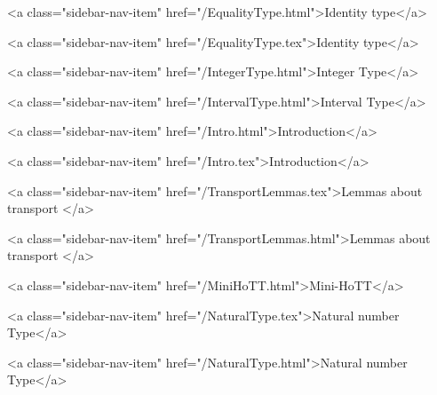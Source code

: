       
        
          <a class="sidebar-nav-item" href="/EqualityType.html">Identity type</a>
        
      
    
      
        
          <a class="sidebar-nav-item" href="/EqualityType.tex">Identity type</a>
        
      
    
      
        
          <a class="sidebar-nav-item" href="/IntegerType.html">Integer Type</a>
        
      
    
      
        
          <a class="sidebar-nav-item" href="/IntervalType.html">Interval Type</a>
        
      
    
      
        
          <a class="sidebar-nav-item" href="/Intro.html">Introduction</a>
        
      
    
      
        
          <a class="sidebar-nav-item" href="/Intro.tex">Introduction</a>
        
      
    
      
        
          <a class="sidebar-nav-item" href="/TransportLemmas.tex">Lemmas about transport </a>
        
      
    
      
        
          <a class="sidebar-nav-item" href="/TransportLemmas.html">Lemmas about transport </a>
        
      
    
      
        
          <a class="sidebar-nav-item" href="/MiniHoTT.html">Mini-HoTT</a>
        
      
    
      
        
          <a class="sidebar-nav-item" href="/NaturalType.tex">Natural number Type</a>
        
      
    
      
        
          <a class="sidebar-nav-item" href="/NaturalType.html">Natural number Type</a>
        
      
    

